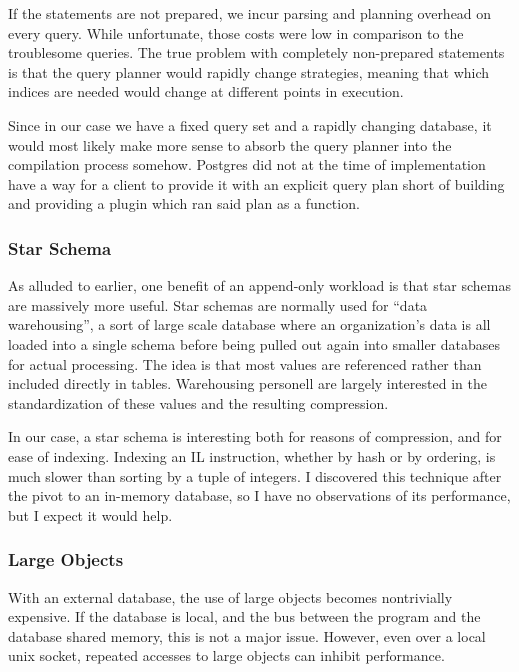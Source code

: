 If the statements are not prepared, we incur parsing and planning overhead on every query.
While unfortunate, those costs were low in comparison to the troublesome queries.
The true problem with completely non-prepared statements is that the query planner would rapidly change strategies, meaning that which indices are needed would change at different points in execution.

Since in our case we have a fixed query set and a rapidly changing database, it would most likely make more sense to absorb the query planner into the compilation process somehow.
Postgres did not at the time of implementation have a way for a client to provide it with an explicit query plan short of building and providing a plugin which ran said plan as a function.

\subsubsection{Star Schema}
As alluded to earlier, one benefit of an append-only workload is that star schemas are massively more useful.
Star schemas are normally used for ``data warehousing'', a sort of large scale database where an organization's data is all loaded into a single schema before being pulled out again into smaller databases for actual processing.
The idea is that most values are referenced rather than included directly in tables.
Warehousing personell are largely interested in the standardization of these values and the resulting compression.

In our case, a star schema is interesting both for reasons of compression, and for ease of indexing.
Indexing an IL instruction, whether by hash or by ordering, is much slower than sorting by a tuple of integers.
I discovered this technique after the pivot to an in-memory database, so I have no observations of its performance, but I expect it would help.

\subsubsection{Large Objects}
With an external database, the use of large objects becomes nontrivially expensive.
If the database is local, and the bus between the program and the database shared memory, this is not a major issue.
However, even over a local unix socket, repeated accesses to large objects can inhibit performance.

